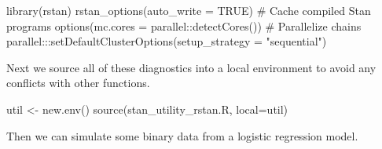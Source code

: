 \documentclass[
  letterpaper,
  DIV=11,
  numbers=noendperiod]{scrartcl}
\newenvironment{Shaded}{\begin{snugshade}}{\end{snugshade}}
\newcommand{\AttributeTok}[1]{\textcolor[rgb]{0.40,0.45,0.13}{#1}}
\newcommand{\CommentTok}[1]{\textcolor[rgb]{0.37,0.37,0.37}{#1}}
\newcommand{\ConstantTok}[1]{\textcolor[rgb]{0.56,0.35,0.01}{#1}}
\newcommand{\FunctionTok}[1]{\textcolor[rgb]{0.28,0.35,0.67}{#1}}
\newcommand{\NormalTok}[1]{\textcolor[rgb]{0.00,0.23,0.31}{#1}}
\newcommand{\OtherTok}[1]{\textcolor[rgb]{0.00,0.23,0.31}{#1}}
\newcommand{\SpecialCharTok}[1]{\textcolor[rgb]{0.37,0.37,0.37}{#1}}
\newcommand{\StringTok}[1]{\textcolor[rgb]{0.13,0.47,0.30}{#1}}
\begin{document}
\begin{Shaded}
\begin{Highlighting}[]
\FunctionTok{library}\NormalTok{(rstan)}
\FunctionTok{rstan\_options}\NormalTok{(}\AttributeTok{auto\_write =} \ConstantTok{TRUE}\NormalTok{)            }\CommentTok{\# Cache compiled Stan programs}
\FunctionTok{options}\NormalTok{(}\AttributeTok{mc.cores =}\NormalTok{ parallel}\SpecialCharTok{::}\FunctionTok{detectCores}\NormalTok{()) }\CommentTok{\# Parallelize chains}
\NormalTok{parallel}\SpecialCharTok{:::}\FunctionTok{setDefaultClusterOptions}\NormalTok{(}\AttributeTok{setup\_strategy =} \StringTok{"sequential"}\NormalTok{)}
\end{Highlighting}
\end{Shaded}

Next we source all of these diagnostics into a local environment to
avoid any conflicts with other functions.

\begin{Shaded}
\begin{Highlighting}[]
\NormalTok{util }\OtherTok{\textless{}{-}} \FunctionTok{new.env}\NormalTok{()}
\FunctionTok{source}\NormalTok{(}\StringTok{\textquotesingle{}stan\_utility\_rstan.R\textquotesingle{}}\NormalTok{, }\AttributeTok{local=}\NormalTok{util)}
\end{Highlighting}
\end{Shaded}

Then we can simulate some binary data from a logistic regression model.
\end{document}
